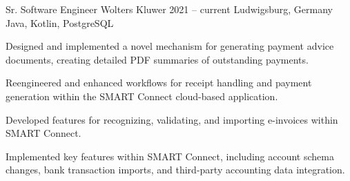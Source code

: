 \cvexperience
  {Sr. Software Engineer}
  {Wolters Kluwer}
  {2021 -- current}
  {Ludwigsburg, Germany}
  {Java, Kotlin, PostgreSQL}
  {%
    \item Designed and implemented a novel mechanism for generating payment advice documents, creating detailed PDF summaries of outstanding payments.
    \item Reengineered and enhanced workflows for receipt handling and payment generation within the SMART Connect cloud-based application.
    \item Developed features for recognizing, validating, and importing e-invoices within SMART Connect.
    \item Implemented key features within SMART Connect, including account schema changes, bank transaction imports, and third-party accounting data integration.
  }
